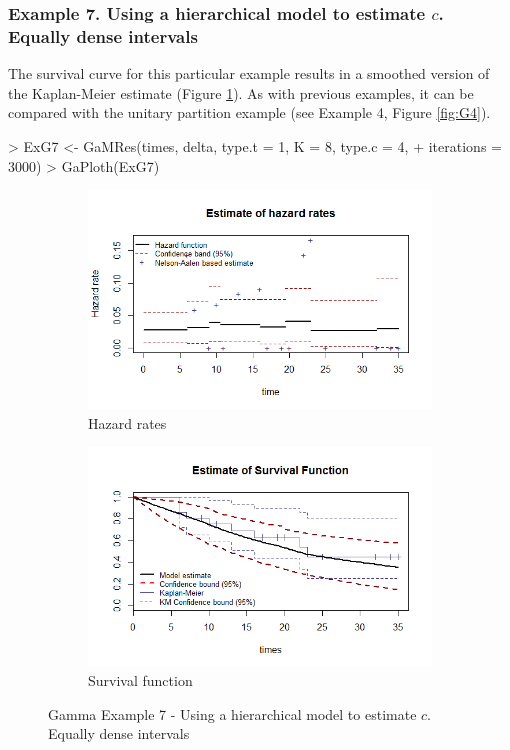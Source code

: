 \documentclass[letterpaper]{article}
\begin{document}
\subsubsection{Example 7. Using a hierarchical model to estimate $c$. Equally dense intervals}

The survival curve for this particular example results in a smoothed version of the Kaplan-Meier estimate (Figure \ref{fig:G7}). As with previous examples, it can be compared with the unitary partition example (see Example 4, Figure \ref{fig:G4}). 

\begin{Schunk}
\begin{Sinput}
> ExG7 <- GaMRes(times, delta, type.t = 1, K = 8, type.c = 4,
+                iterations = 3000)
> GaPloth(ExG7)
\end{Sinput}
\end{Schunk}

\begin{figure}
  \centering
  \begin{subfigure}[a]{\textwidth}\centering
    \includegraphics[width=\textwidth]{G71.png}
    \caption{Hazard rates}
  \end{subfigure}
  \begin{subfigure}[b]{\textwidth}\centering
    \includegraphics[width=\textwidth]{G72.png}
    \caption{Survival function}
  \end{subfigure}
  \caption{Gamma Example 7 - Using a hierarchical model to estimate $c$. Equally dense intervals}
  \label{fig:G7}
\end{figure}
\end{document}
